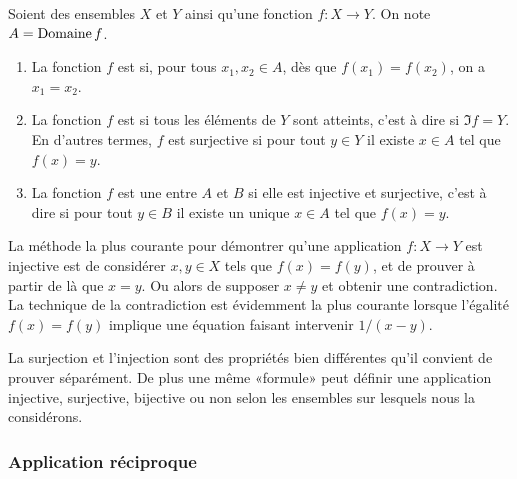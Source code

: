 \begin{definition}       \label{DEFooBFCQooPyKvRK}
    Soient des ensembles \( X\) et \( Y\) ainsi qu'une fonction \( f\colon X\to Y\). On note \( A  = \operatorname{Domaine} f \).
    \begin{enumerate}
        \item
            La fonction \( f\) est  si, pour tous \( x_1, x_2 \in A \), dès que \( f(x_1)=f(x_2)\), on a \( x_1=x_2\).
        \item
            La fonction \( f\) est  si tous les éléments de \( Y\) sont atteints, c'est à dire si \( \Im f = Y\). En d'autres termes,  \( f \) est surjective si pour tout \( y\in Y\) il existe \( x\in A\) tel que \( f(x)=y\).
        \item
            La fonction \( f\) est une  entre \( A\) et \( B\) si elle est injective et surjective, c'est à dire si pour tout \( y\in B\) il existe un unique \( x\in A\) tel que \( f(x)=y\).
    \end{enumerate}
\end{definition}
La méthode la plus courante pour démontrer qu'une application \( f\colon X\to Y\) est injective est de considérer \( x,y\in X\) tels que \( f(x)=f(y)\), et de prouver à partir de là que \( x=y\). Ou alors de supposer \( x\neq y\) et obtenir une contradiction. La technique de la contradiction est évidemment la plus courante lorsque l'égalité \( f(x)=f(y)\) implique une équation faisant intervenir \( 1/(x-y)\).

La surjection et l'injection sont des propriétés bien différentes qu'il convient de prouver séparément. De plus une même «formule» peut définir une application injective, surjective, bijective ou non selon les ensembles sur lesquels nous la considérons.

\subsubsection{Application réciproque}

